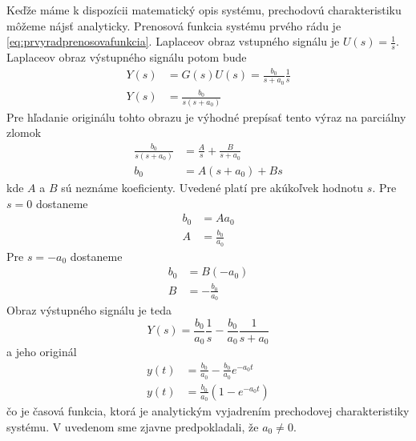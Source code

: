 \documentclass[a4paper, 10pt, ]{article}
\begin{document}
Keďže máme k dispozícii matematický opis systému, prechodovú charakteristiku môžeme	nájsť analyticky. Prenosová funkcia systému prvého rádu je \eqref{eq:prvyradprenosovafunkcia}. Laplaceov obraz vstupného signálu je $U(s) = \frac{1}{s}$. Laplaceov obraz výstupného signálu potom bude
\begin{subequations}
\begin{align}
    Y(s) &= G(s) U(s) = \frac{b_0}{s + a_0} \frac{1}{s} \\
    Y(s) &= \frac{b_0}{s(s + a_0)}
\end{align}
\end{subequations}
Pre hľadanie originálu tohto obrazu je výhodné prepísať tento výraz na parciálny zlomok
\begin{subequations}
\begin{align}
    \frac{b_0}{s(s + a_0)} &= \frac{A}{s} + \frac{B}{s + a_0} \\
    b_0 &= A(s + a_0) + B s
\end{align}
\end{subequations}
kde $A$ a $B$ sú neznáme koeficienty. Uvedené platí pre akúkoľvek hodnotu $s$. Pre $s = 0$ dostaneme
\begin{subequations}
\begin{align}
    b_0 &= A a_0 \\
    A &= \frac{b_0}{a_0}
\end{align}
\end{subequations}
Pre $s = -a_0$ dostaneme
\begin{subequations}
\begin{align}
    b_0 &= B (-a_0) \\
    B &= -\frac{b_0}{a_0}
\end{align}
\end{subequations}
Obraz výstupného signálu je teda
\begin{equation}
    Y(s) = \frac{b_0}{a_0} \frac{1}{s} - \frac{b_0}{a_0} \frac{1}{s + a_0}
\end{equation}
a jeho originál
\begin{subequations}
\begin{align}
    y(t) &= \frac{b_0}{a_0} - \frac{b_0}{a_0} e^{-a_0 t} \\
    y(t) &= \frac{b_0}{a_0} \left(1 - e^{-a_0 t}\right)  \label{eq:PCH1Rfull}
\end{align}
\end{subequations}
čo je časová funkcia, ktorá je analytickým vyjadrením prechodovej charakteristiky systému. V uvedenom sme zjavne predpokladali, že $a_0 \neq 0$. 
\end{document}
